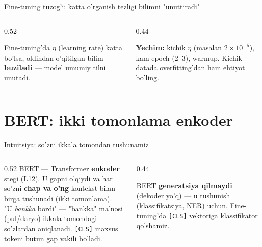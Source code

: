 \documentclass[aspectratio=169,11pt]{beamer}
\begin{document}
\begin{frame}{Fine-tuning tuzog'i: katta o'rganish tezligi bilimni "unuttiradi"}
  \begin{columns}[T]
    \begin{column}{0.52\textwidth}
      \begin{tcolorbox}[warnbox,title={Catastrophic forgetting}]
        \small
        Fine-tuning'da $\eta$ (learning rate) katta bo'lsa, oldindan o'qitilgan
        bilim \textbf{buziladi} --- model umumiy tilni unutadi.
      \end{tcolorbox}
    \end{column}
    \begin{column}{0.44\textwidth}
      \begin{tcolorbox}[okbox,top=2pt,bottom=2pt]
        \footnotesize
        \textbf{Yechim:} kichik $\eta$ (masalan $2\times 10^{-5}$), kam epoch
        (2--3), warmup. Kichik datada overfitting'dan ham ehtiyot bo'ling.
      \end{tcolorbox}
    \end{column}
  \end{columns}
\end{frame}

\section[BERT]{BERT: ikki tomonlama enkoder}

\begin{frame}{Intuitsiya: so'zni ikkala tomondan tushunamiz}
  \begin{columns}[T]
    \begin{column}{0.52\textwidth}
      \small
      BERT --- Transformer \textbf{enkoder} stegi (L12). U gapni o'qiydi va har
      so'zni \textbf{chap va o'ng} kontekst bilan birga tushunadi (ikki tomonlama).\\[5pt]
      "U \textit{bankka} bordi" --- "bankka" ma'nosi (pul/daryo) ikkala tomondagi
      so'zlardan aniqlanadi. \texttt{[CLS]} maxsus tokeni butun gap vakili bo'ladi.
    \end{column}
    \begin{column}{0.44\textwidth}
      \begin{tcolorbox}[okbox,top=2pt,bottom=2pt]
        \footnotesize
        BERT \textbf{generatsiya qilmaydi} (dekoder yo'q) --- u tushunish
        (klassifikatsiya, NER) uchun. Fine-tuning'da \texttt{[CLS]} vektoriga
        klassifikator qo'shamiz.
      \end{tcolorbox}
    \end{column}
  \end{columns}
\end{frame}
\end{document}
